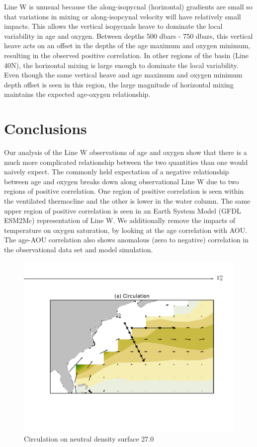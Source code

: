 Line W is unusual because the along-isopycnal (horizontal) gradients are small so that variations in mixing or along-isopcynal velocity will have relatively small impacts. This allows the vertical isopycnals heave to dominate the local variability in age and oxygen. Between depths 500 dbars - 750 dbars, this vertical heave acts on an offset in the depths of the age maximum and oxygen minimum, resulting in the observed positive correlation. In other regions of the basin (Line 40N), the horizontal mixing is large enough to dominate the local variability. Even though the same vertical heave and age maximum and oxygen minimum depth offset is seen in this region, the large magnitude of horizontal mixing maintains the expected age-oxygen relationship.



\section{Conclusions}
Our analysis of the Line W observations of age and oxygen show that there is a much more complicated relationship between the two quantities than one would naively expect. The commonly held expectation of a negative relationship between age and oxygen breaks down along observational Line W due to two regions of positive correlation. One region of positive correlation is seen within the ventilated thermocline and the other is lower in the water column. The same upper region of positive correlation is seen in an Earth System Model (GFDL ESM2Mc) representation of Line W. We additionally remove the impacts of temperature on oxygen saturation, by looking at the age correlation with AOU. The age-AOU correlation also shows anomalous (zero to negative) correlation in the observational data set and model simulation.

\begin{figure}
\centering
\includegraphics[width=\linewidth]{circulation.pdf}
\caption{Circulation on neutral density surface 27.0}
\label{fig:fig6}
\end{figure}

